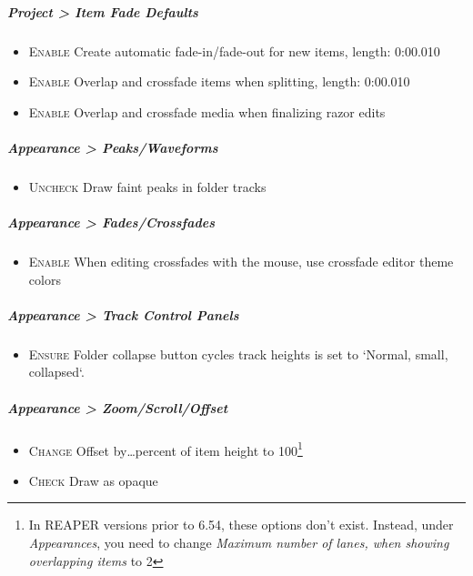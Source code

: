 \documentclass[10pt,american]{article}
\begin{document}
\subparagraph{Project > Item Fade Defaults }
\begin{itemize}
\item \begin{flushleft} \textsc{Enable} Create automatic fade-in/fade-out for
new items, length: 0:00.010 \par\end{flushleft}
\item \begin{flushleft} \textsc{Enable} Overlap and crossfade items when
splitting, length: 0:00.010 \par\end{flushleft}
\item \begin{flushleft} \textsc{Enable} Overlap and crossfade media when
finalizing razor edits \par\end{flushleft}
\end{itemize}

\subparagraph{Appearance > Peaks/Waveforms }
\begin{itemize}
\item \begin{flushleft} \textsc{Uncheck} Draw faint peaks in folder tracks
\par\end{flushleft}
\end{itemize}

\subparagraph{Appearance > Fades/Crossfades }
\begin{itemize}
\item \begin{flushleft} \textsc{Enable} When editing crossfades with the mouse,
use crossfade editor theme colors \par\end{flushleft}
\end{itemize}

\subparagraph{Appearance > Track Control Panels}
\begin{itemize}
\item \begin{flushleft} \textsc{Ensure} Folder collapse button cycles track
heights is set to `Normal, small, collapsed`. \par\end{flushleft}
\end{itemize}

\subparagraph{Appearance > Zoom/Scroll/Offset}
\begin{itemize}
\item \begin{flushleft} \textsc{Change} Offset by\dots percent of item height to
100\footnote{In REAPER versions prior to 6.54, these options don't exist.
Instead, under \emph{Appearances}, you need to change \emph{Maximum number of
lanes, when showing overlapping items} to 2} \par\end{flushleft}
\item \textsc{Check} Draw as opaque
\end{itemize}
\end{document}
